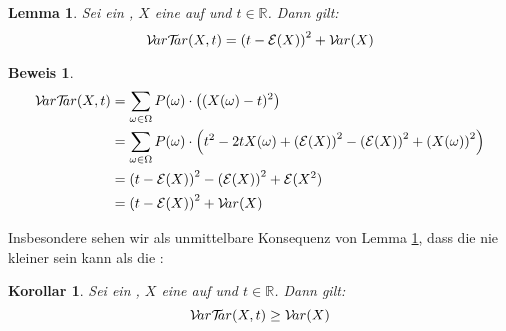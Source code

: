 \documentclass[a4paper]{article}
\newtheorem{korollar}[satz]{Korollar}
\newtheorem{lemma}[satz]{Lemma}
\theoremstyle{nonumberplain}
\newtheorem{beweis}{Beweis}
\begin{document}
\begin{lemma}\label{lem-vtqf}
	Sei \probspaceex{} ein \probspace{}, $X$ eine \rvar{} auf \probspaceex{} und $t \in \mathbb{R}$. Dann gilt:
	\begin{equation}
	\mathcal{V}\!ar \mathcal{T}\!\!ar(X,t) = \left(t - \mathcal{E}(X)\right)^2 + \mathcal{V}\!ar(X)
	\end{equation}
\end{lemma}
\begin{beweis}
	\begin{align*}
	\mathcal{V}\!ar \mathcal{T}\!\!ar(X,t) & =  \sum_{\omega \in \Omega}{P(\omega) \cdot \left((X(\omega)-t)^2\right)} \\
	 & = \sum_{\omega \in \Omega}{P(\omega) \cdot \left(t^2 -2tX(\omega) + \left(\mathcal{E}(X)\right)^2 - \left(\mathcal{E}(X)\right)^2 + \left(X(\omega)\right)^2\right)} \\
	 & = \left(t - \mathcal{E}(X)\right)^2 - \left(\mathcal{E}(X)\right)^2 + \mathcal{E}(X^2) \\
	 & = \left(t - \mathcal{E}(X)\right)^2 + \mathcal{V}\!ar(X) \\
	\end{align*}
\end{beweis}
Insbesondere sehen wir als unmittelbare Konsequenz von Lemma \ref{lem-vtqf}, dass die \vt{} nie kleiner sein kann als die \var{}:
\begin{korollar}\label{kor-vtt-rel}
	Sei \probspaceex{} ein \probspace{}, $X$ eine \rvar{} auf \probspaceex{} und $t \in \mathbb{R}$. Dann gilt:
	\begin{equation}
		\mathcal{V}\!ar \mathcal{T}\!\!ar(X,t) \geq \mathcal{V}\!ar(X)
	\end{equation}
\end{korollar}
\begin{comment}
\begin{beweis}
Sei $\mu = \mathcal{E}_{\probspaceexraw{}}(X)$ der Erwartungswert von $X$. So erhalten wir:
\begin{align*}
& & (t-\mu)^2 &\geq 0\\
\implies & & -2t\mu + 2\mu^2 + t^2 - \mu^2 &\geq 0\\
\implies & & \sum_{\omega \in \Omega}{P(\omega)} \cdot (-2t X(\omega) + 2\mu X(\omega) + t^2 - \mu^2) &\geq 0\\
\implies & & \sum_{\omega \in \Omega}{P(\omega)} \cdot \left((X(\omega)-t)^2 - (X(\omega) - \mu)^2\right) &\geq 0\\
\implies & & \sum_{\omega \in \Omega}{P(\omega)} \cdot \left((X(\omega)-t)^2\right) &\geq \sum_{\omega \in \Omega}{P(\omega)} \cdot \left((X(\omega) - \mu)^2\right)\\
\end{align*}
\end{beweis}
\end{comment}
\end{document}
